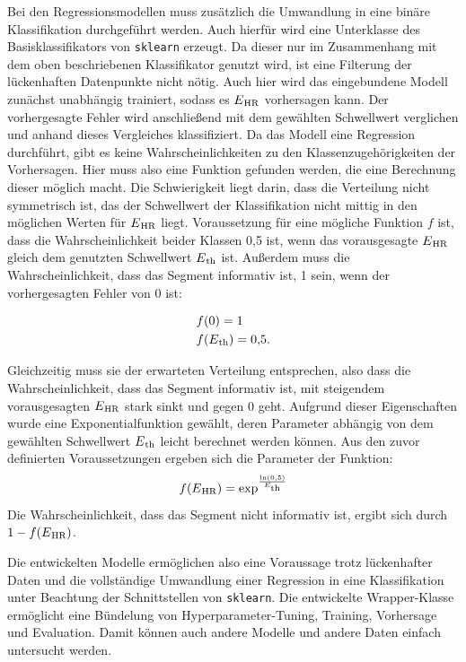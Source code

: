 Bei den Regressionsmodellen muss zusätzlich die Umwandlung in eine binäre Klassifikation durchgeführt werden.  Auch hierfür wird eine Unterklasse des Basisklassifikators von \texttt{sklearn} erzeugt. Da dieser nur im Zusammenhang mit dem oben beschriebenen Klassifikator genutzt wird, ist eine Filterung der lückenhaften Datenpunkte nicht nötig. Auch hier wird das eingebundene Modell zunächst unabhängig trainiert, sodass es $E\textsubscript{HR}$ vorhersagen kann. Der vorhergesagte Fehler wird anschließend mit dem gewählten Schwellwert verglichen und anhand dieses Vergleiches klassifiziert. Da das Modell eine Regression durchführt, gibt es keine Wahrscheinlichkeiten zu den Klassenzugehörigkeiten der Vorhersagen. Hier muss also eine Funktion gefunden werden, die eine Berechnung dieser möglich macht. Die Schwierigkeit liegt darin, dass die Verteilung nicht symmetrisch ist, das der Schwellwert der Klassifikation nicht mittig in den möglichen Werten für $E\textsubscript{HR}$ liegt. Voraussetzung für eine mögliche Funktion $f$ ist, dass die Wahrscheinlichkeit beider Klassen 0,5 ist, wenn das vorausgesagte $E\textsubscript{HR}$ gleich dem genutzten Schwellwert $E\textsubscript{th}$ ist. Außerdem muss die Wahrscheinlichkeit, dass das Segment informativ ist, 1 sein, wenn der vorhergesagten Fehler von 0 ist:

\begin{align*}
	&f(0) = 1\\
	&f(E\textsubscript{th}) = 0{,}5\text{.}
\end{align*}


Gleichzeitig muss sie der erwarteten Verteilung entsprechen, also dass die Wahrscheinlichkeit, dass das Segment informativ ist, mit steigendem vorausgesagten $E\textsubscript{HR}$ stark sinkt und gegen 0 geht. Aufgrund dieser Eigenschaften wurde eine Exponentialfunktion gewählt, deren Parameter abhängig von dem gewählten Schwellwert $E\textsubscript{th}$ leicht berechnet werden können. Aus den zuvor definierten Voraussetzungen ergeben sich die Parameter der Funktion:
\[
	f(E\textsubscript{HR}) = \text{exp}^{\frac{\text{ln}(0,5)}{E\textsubscript{th}}}
\]
Die Wahrscheinlichkeit, dass das Segment nicht informativ ist, ergibt sich durch $1 - f(E\textsubscript{HR})$.

Die entwickelten Modelle ermöglichen also eine Voraussage trotz lückenhafter Daten und die vollständige Umwandlung einer Regression in eine Klassifikation unter Beachtung der Schnittstellen von \texttt{sklearn}. Die entwickelte Wrapper-Klasse ermöglicht eine Bündelung von Hyperparameter-Tuning, Training, Vorhersage und Evaluation. Damit können auch andere Modelle und andere Daten einfach untersucht werden.





